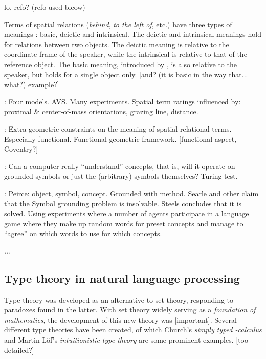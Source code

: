 lo, refo? (refo used bleow)

Terms of spatial relations (\textit{behind}, \textit{to the left of}, etc.) have three types of meanings \citep{Garnhamunifiedtheorymeaning1989}: basic, deictic and intrinsical.
The deictic and intrinsical meanings hold for relations between two objects.
The deictic meaning is relative to the coordinate frame of the speaker, while the intrinsical is relative to that of the reference object.
The basic meaning, introduced by \cite{Garnhamunifiedtheorymeaning1989}, is also relative to the speaker, but holds for a single object only.
[and? (it is basic in the way that... what?) example?]

\cite{RegierGroundingspatiallanguage2001a}:
Four models. AVS.
Many experiments.
Spatial term ratings influenced by: proximal \& center-of-mass orientations, grazing line, distance.

\cite{CoventryClassificationExtrageometricInfluences2004}:
Extra-geometric constraints on the meaning of spatial relational terms.
Especially functional.
Functional geometric framework.
[functional aspect, Coventry?]

\cite{HarnadSymbolGroundingProblem1990}:
Can a computer really ``understand'' concepts, that is, will it operate on grounded symbols or just the (arbitrary) symbols themselves?
Turing test.

\cite{SteelsSymbolGroundingProblem2007}:
Peirce: object, symbol, concept. Grounded with method.
Searle and other claim that the Symbol grounding problem is insolvable.
Steels concludes that it is solved.
Using experiments where a number of agents participate in a language game where they make up random words for preset concepts and manage to ``agree'' on which words to use for which concepts.

...



\subsection{Type theory in natural language processing}

Type theory was developed as an alternative to set theory, responding to paradoxes found in the latter.
With set theory widely serving as a \textit{foundation of mathematics}, the development of this new theory was [important].
Several different type theories have been created, of which Church's \textit{simply typed \textlambda-calculus} \cite{church40} and Martin-Löf's \textit{intuitionistic type theory} \citep{martinlof84} are some prominent examples.
\citep{CoquandTypeTheory2015} [too detailed?]

